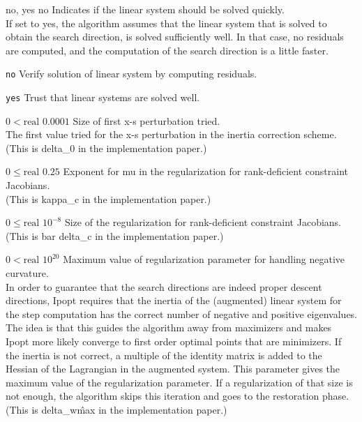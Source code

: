 %
{no, yes}%
{no}%
{Indicates if the linear system should be solved quickly.\\
If set to yes, the algorithm assumes that the linear system that is solved to obtain the search direction, is solved sufficiently well. In that case, no residuals are computed, and the computation of the search direction is a little faster.}%
{\begin{list}{}{
\setlength{\parsep}{0em}
\setlength{\leftmargin}{5ex}
\setlength{\labelwidth}{2ex}
\setlength{\itemindent}{0ex}
\setlength{\topsep}{0pt}}
\item[\texttt{no}] Verify solution of linear system by computing residuals.
\item[\texttt{yes}] Trust that linear systems are solved well.
\end{list}
}

%
{$0<\textrm{real}$}%
{$0.0001$}%
{Size of first x-s perturbation tried.\\
The first value tried for the x-s perturbation in the inertia correction scheme.(This is delta\_0 in the implementation paper.)}%
{}

%
{$0\leq\textrm{real}$}%
{$0.25$}%
{Exponent for mu in the regularization for rank-deficient constraint Jacobians.\\
(This is kappa\_c in the implementation paper.)}%
{}

%
{$0\leq\textrm{real}$}%
{$10^{- 8}$}%
{Size of the regularization for rank-deficient constraint Jacobians.\\
(This is bar delta\_c in the implementation paper.)}%
{}

%
{$0<\textrm{real}$}%
{$10^{ 20}$}%
{Maximum value of regularization parameter for handling negative curvature.\\
In order to guarantee that the search directions are indeed proper descent directions, Ipopt requires that the inertia of the (augmented) linear system for the step computation has the correct number of negative and positive eigenvalues. The idea is that this guides the algorithm away from maximizers and makes Ipopt more likely converge to first order optimal points that are minimizers. If the inertia is not correct, a multiple of the identity matrix is added to the Hessian of the Lagrangian in the augmented system. This parameter gives the maximum value of the regularization parameter. If a regularization of that size is not enough, the algorithm skips this iteration and goes to the restoration phase. (This is delta\_w\^max in the implementation paper.)}%
{}

